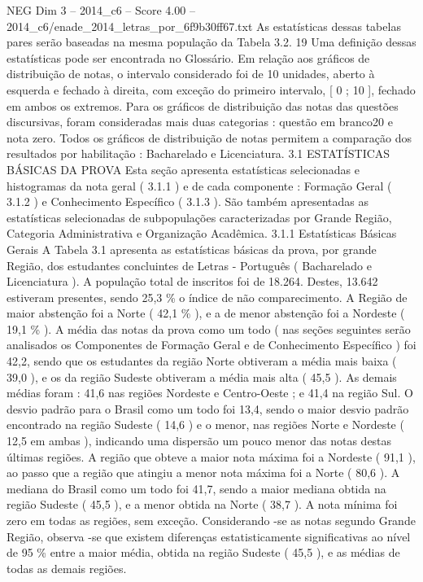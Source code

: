 \begin{textsample}{NEG Dim 3 – 2014\_c6 – Score 4.00 – 2014\_c6/enade\_2014\_letras\_por\_6f9b30ff67.txt}
As estatísticas dessas tabelas pares serão baseadas na mesma população da Tabela 3.2. 19 Uma definição dessas estatísticas pode ser encontrada no Glossário.
Em relação aos gráficos de distribuição de notas, o intervalo considerado foi de 10 unidades, aberto à esquerda e fechado à direita, com exceção do primeiro intervalo, [ 0 ; 10 ], fechado em ambos os extremos.
Para os gráficos de distribuição das notas das questões discursivas, foram consideradas mais duas categorias : questão em branco20 e nota zero.
Todos os gráficos de distribuição de notas permitem a comparação dos resultados por habilitação : Bacharelado e Licenciatura. 3.1 ESTATÍSTICAS BÁSICAS DA PROVA Esta seção apresenta estatísticas selecionadas e histogramas da nota geral ( 3.1.1 ) e de cada componente : Formação Geral ( 3.1.2 ) e Conhecimento Específico ( 3.1.3 ).
São também apresentadas as estatísticas selecionadas de subpopulações caracterizadas por Grande Região, Categoria Administrativa e Organização Acadêmica. 3.1.1 Estatísticas Básicas Gerais A Tabela 3.1 apresenta as estatísticas básicas da prova, por grande Região, dos estudantes concluintes de Letras - Português ( Bacharelado e Licenciatura ).
A população total de inscritos foi de 18.264.
Destes, 13.642 estiveram presentes, sendo 25,3 \% o índice de não comparecimento.
A Região de maior abstenção foi a Norte ( 42,1 \% ), e a de menor abstenção foi a Nordeste ( 19,1 \% ).
A média das notas da prova como um todo ( nas seções seguintes serão analisados os Componentes de Formação Geral e de Conhecimento Específico ) foi 42,2, sendo que os estudantes da região Norte obtiveram a média mais baixa ( 39,0 ), e os da região Sudeste obtiveram a média mais alta ( 45,5 ).
As demais médias foram : 41,6 nas regiões Nordeste e Centro-Oeste ; e 41,4 na região Sul.
O desvio padrão para o Brasil como um todo foi 13,4, sendo o maior desvio padrão encontrado na região Sudeste ( 14,6 ) e o menor, nas regiões Norte e Nordeste ( 12,5 em ambas ), indicando uma dispersão um pouco menor das notas destas últimas regiões.
A região que obteve a maior nota máxima foi a Nordeste ( 91,1 ), ao passo que a região que atingiu a menor nota máxima foi a Norte ( 80,6 ).
A mediana do Brasil como um todo foi 41,7, sendo a maior mediana obtida na região Sudeste ( 45,5 ), e a menor obtida na Norte ( 38,7 ).
A nota mínima foi zero em todas as regiões, sem exceção.
Considerando -se as notas segundo Grande Região, observa -se que existem diferenças estatisticamente significativas ao nível de 95 \% entre a maior média, obtida na região Sudeste ( 45,5 ), e as médias de todas as demais regiões.

\end{textsample}

